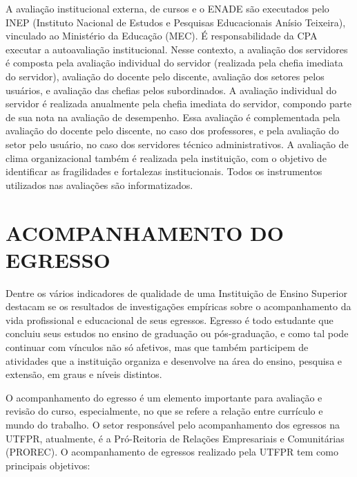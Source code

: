 A avaliação institucional externa, de cursos e o ENADE são executados pelo INEP (Instituto Nacional de Estudos e Pesquisas Educacionais Anísio Teixeira), vinculado ao Ministério da Educação (MEC). É responsabilidade da CPA executar a autoavaliação institucional. Nesse contexto, a avaliação dos servidores é composta pela avaliação individual do servidor (realizada pela chefia imediata do servidor), avaliação do docente pelo discente, avaliação dos setores pelos usuários, e avaliação das chefias pelos subordinados. A avaliação individual do servidor é realizada anualmente pela chefia imediata do servidor, compondo parte de sua nota na avaliação de desempenho. Essa avaliação é complementada pela avaliação do docente pelo discente, no caso dos professores, e pela avaliação do setor pelo usuário, no caso dos servidores técnico administrativos. A avaliação de clima organizacional também é realizada pela instituição, com o objetivo de identificar as fragilidades e fortalezas institucionais. Todos os instrumentos utilizados nas avaliações são informatizados.

\section{ACOMPANHAMENTO DO EGRESSO}

Dentre os vários indicadores de qualidade de uma Instituição de Ensino Superior destacam se os resultados de investigações empíricas sobre o acompanhamento da vida profissional e educacional de seus egressos. Egresso é todo estudante que concluiu seus estudos no ensino de graduação ou pós-graduação, e como tal pode continuar com vínculos não só afetivos, mas que também participem de atividades que a instituição organiza e desenvolve na área do ensino, pesquisa e extensão, em graus e níveis distintos.

O acompanhamento do egresso é um elemento importante para avaliação e revisão do curso, especialmente, no que se refere a relação entre currículo e mundo do trabalho. O setor responsável pelo acompanhamento dos egressos na UTFPR, atualmente, é a Pró-Reitoria de Relações Empresariais e Comunitárias (PROREC). O acompanhamento de egressos realizado pela UTFPR tem como principais objetivos:

